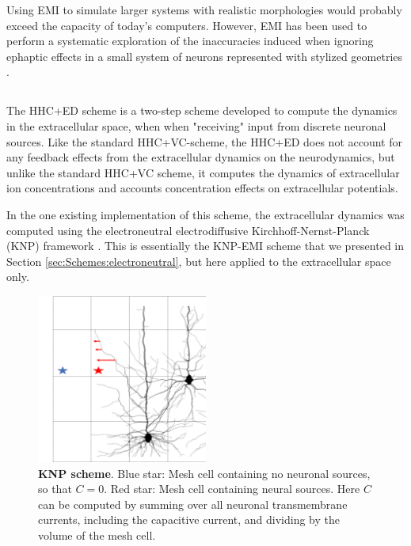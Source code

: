 Using EMI to simulate larger systems with realistic morphologies would probably exceed the capacity of today's computers. However, EMI has been used to perform a systematic exploration of the inaccuracies induced when ignoring ephaptic effects in a small system of neurons represented with stylized geometries  \citep{Tveito2019}.


\subsection{}
\label{sec:Schemes:KNP}
The HHC+ED scheme is a two-step scheme developed to compute the dynamics in the extracellular space, when when "receiving" input from discrete neuronal sources. Like the standard HHC+VC-scheme, the HHC+ED does not account for any feedback effects from the extracellular dynamics on the neurodynamics, but unlike the standard HHC+VC scheme, it computes the dynamics of extracellular ion concentrations and accounts concentration effects on extracellular potentials. 

In the one existing implementation of this scheme, the extracellular dynamics was computed using the electroneutral electrodiffusive Kirchhoff-Nernst-Planck (KNP) framework \citep{Solbra2018}. This is essentially the KNP-EMI scheme that we presented in Section \ref{sec:Schemes:electroneutral}, but here applied to the extracellular space only.

\begin{figure}[!ht]
\begin{center}
\includegraphics[width=0.5\textwidth]{Figures/Eldiff/KNP.png}
\end{center}
\caption{\textbf{KNP scheme}. Blue star: Mesh cell containing no neuronal sources, so that $C=0$. Red star: Mesh cell containing neural sources. Here $C$ can be computed by summing over all neuronal transmembrane currents, including the capacitive current, and dividing by the volume of the mesh cell. }
\label{Eldiff:fig:KNPmesh}
\end{figure}

